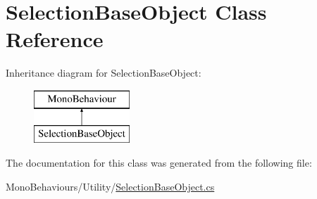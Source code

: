 \hypertarget{class_selection_base_object}{}\section{Selection\+Base\+Object Class Reference}
\label{class_selection_base_object}
Inheritance diagram for Selection\+Base\+Object\+:\begin{figure}[H]
\begin{center}
\leavevmode
\includegraphics[height=2.000000cm]{class_selection_base_object}
\end{center}
\end{figure}


The documentation for this class was generated from the following file\+:\begin{DoxyCompactItemize}
\item 
Mono\+Behaviours/\+Utility/\hyperlink{_selection_base_object_8cs}{Selection\+Base\+Object.\+cs}\end{DoxyCompactItemize}
